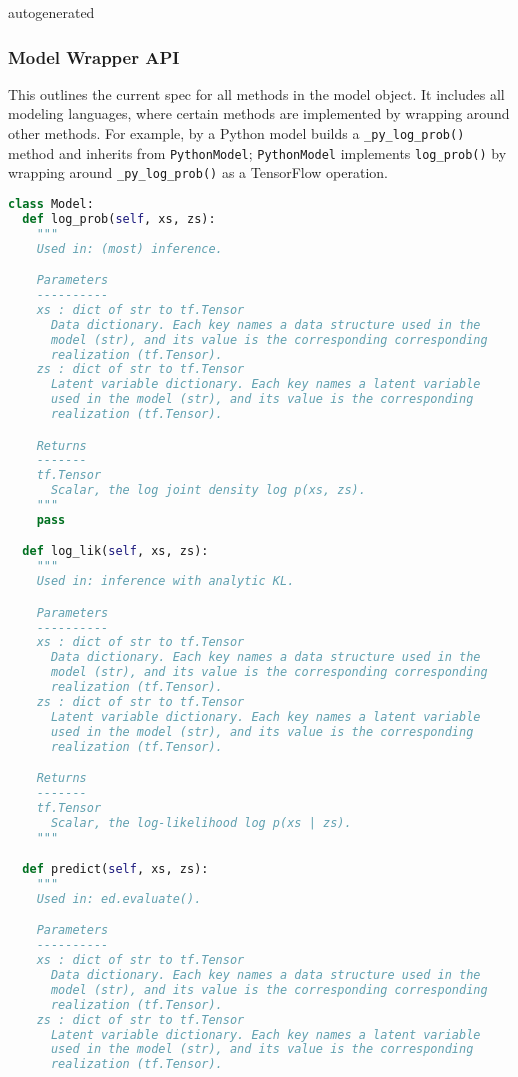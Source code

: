 {{autogenerated}}

\subsubsection{Model Wrapper API}

This outlines the current spec for all methods in the model object.
It includes all modeling languages, where certain methods are
implemented by wrapping around other methods. For example, by a Python
model builds a \texttt{_py_log_prob()} method and inherits from
\texttt{PythonModel}; \texttt{PythonModel} implements \texttt{log_prob()} by wrapping
around \texttt{_py_log_prob()} as a TensorFlow operation.

\begin{lstlisting}[language=Python]
class Model:
  def log_prob(self, xs, zs):
    """
    Used in: (most) inference.

    Parameters
    ----------
    xs : dict of str to tf.Tensor
      Data dictionary. Each key names a data structure used in the
      model (str), and its value is the corresponding corresponding
      realization (tf.Tensor).
    zs : dict of str to tf.Tensor
      Latent variable dictionary. Each key names a latent variable
      used in the model (str), and its value is the corresponding
      realization (tf.Tensor).

    Returns
    -------
    tf.Tensor
      Scalar, the log joint density log p(xs, zs).
    """
    pass

  def log_lik(self, xs, zs):
    """
    Used in: inference with analytic KL.

    Parameters
    ----------
    xs : dict of str to tf.Tensor
      Data dictionary. Each key names a data structure used in the
      model (str), and its value is the corresponding corresponding
      realization (tf.Tensor).
    zs : dict of str to tf.Tensor
      Latent variable dictionary. Each key names a latent variable
      used in the model (str), and its value is the corresponding
      realization (tf.Tensor).

    Returns
    -------
    tf.Tensor
      Scalar, the log-likelihood log p(xs | zs).
    """

  def predict(self, xs, zs):
    """
    Used in: ed.evaluate().

    Parameters
    ----------
    xs : dict of str to tf.Tensor
      Data dictionary. Each key names a data structure used in the
      model (str), and its value is the corresponding corresponding
      realization (tf.Tensor).
    zs : dict of str to tf.Tensor
      Latent variable dictionary. Each key names a latent variable
      used in the model (str), and its value is the corresponding
      realization (tf.Tensor).


\end{lstlisting}
